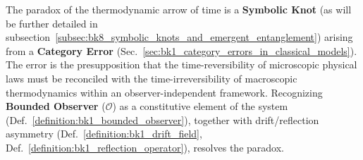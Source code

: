 \begin{theorem}
\label{theorem:bk4_paradoxical_arrow_of_time}
The paradox of the thermodynamic arrow of time is a \textbf{Symbolic Knot} (as will be further detailed in subsection~\ref{subsec:bk8_symbolic_knots_and_emergent_entanglement}) arising from a \textbf{Category Error} (Sec.~\ref{sec:bk1_category_errors_in_classical_models}). The error is the presupposition that the time-reversibility of microscopic physical laws must be reconciled with the time-irreversibility of macroscopic thermodynamics within an observer-independent framework. Recognizing \textbf{Bounded Observer} ($\mathcal{O}$) as a constitutive element of the system (Def.~\ref{definition:bk1_bounded_observer}), together with drift/reflection asymmetry (Def.~\ref{definition:bk1_drift_field}, Def.~\ref{definition:bk1_reflection_operator}), resolves the paradox.
\end{theorem}

